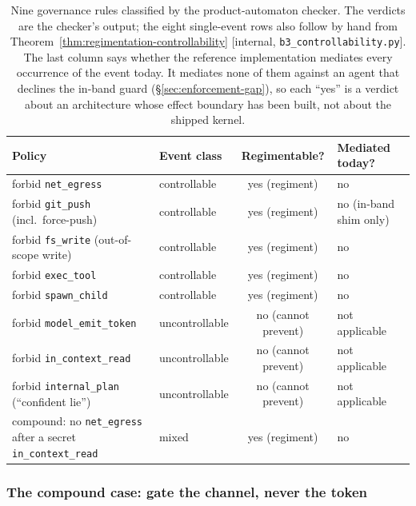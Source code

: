 \documentclass[11pt,a4paper]{article}
\theoremstyle{definition}
\theoremstyle{remark}
\begin{document}
\begin{table}[H]
\centering
\caption{Nine governance rules classified by the product-automaton checker. The verdicts are
the checker's output; the eight single-event rows also follow by hand from
Theorem~\ref{thm:regimentation-controllability} [internal, \texttt{b3\_controllability.py}].
The last column says whether the reference implementation mediates every
occurrence of the event today. It mediates none of them against an agent that
declines the in-band guard (\S\ref{sec:enforcement-gap}), so each ``yes'' is a
verdict about an architecture whose effect boundary has been built, not about
the shipped kernel.}
\label{tab:policy-classification}
\small
\begin{tabularx}{\textwidth}{@{}>{\raggedright\arraybackslash}X l c >{\raggedright\arraybackslash}p{}@{}}
\toprule
\textbf{Policy} & \textbf{Event class} & \textbf{Regimentable?} & \textbf{Mediated today?} \\
\midrule
forbid \texttt{net\_egress} & controllable & yes (regiment) & no \\
forbid \texttt{git\_push} (incl.\ force-push) & controllable & yes (regiment) & no (in-band shim only) \\
forbid \texttt{fs\_write} (out-of-scope write) & controllable & yes (regiment) & no \\
forbid \texttt{exec\_tool} & controllable & yes (regiment) & no \\
forbid \texttt{spawn\_child} & controllable & yes (regiment) & no \\
forbid \texttt{model\_emit\_token} & uncontrollable & no (cannot prevent) & not applicable \\
forbid \texttt{in\_context\_read} & uncontrollable & no (cannot prevent) & not applicable \\
forbid \texttt{internal\_plan} (``confident lie'') & uncontrollable & no (cannot prevent) & not applicable \\
\midrule
compound: no \texttt{net\_egress} after a secret \texttt{in\_context\_read} & mixed & yes (regiment) & no \\
\bottomrule
\end{tabularx}
\end{table}

\subsubsection{The compound case: gate the channel, never the token}
\label{sec:gate-the-channel}
\end{document}
